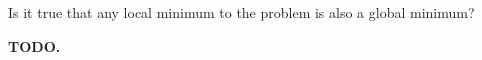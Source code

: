 Is it true that any local minimum to the problem is also a global minimum?


\begin{solution}
    \bf{TODO.}
    \ \\
    \vfill
\end{solution}